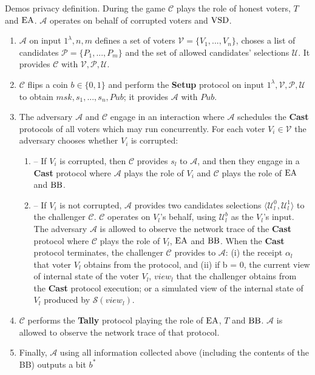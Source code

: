 \begin{definition}{ Demos privacy definition.}
 During the game $\mathcal{C}$ plays the role of honest voters, $T$ and $\operatorname{EA}$. $\mathcal{A}$ operates on behalf of corrupted voters and $\operatorname{VSD}$. 
\begin{enumerate}
\item $\mathcal{A}$ on input $1^{\lambda},n,m$ defines a set of voters  $\mathcal{V} = \{V_1,...,V_n\}$, choses a list of candidates  $\mathcal{P} = \{P_1,...,P_m\}$ and the set of allowed candidates' selections $\mathcal{U}$.  It provides $\mathcal{C}$ with $\mathcal{V}, \mathcal{P}, \mathcal{U}$.
\item $\mathcal{C}$ flips a coin $b\in \{0,1\}$ and perform the \textbf{Setup} protocol on input $1^{\lambda},\mathcal{V}, \mathcal{P}, \mathcal{U}$ to obtain $msk,s_1,...,s_n, Pub$; it provides  $\mathcal{A}$ with $Pub$. 
\item The adversary $\mathcal{A}$  and $\mathcal{C}$ engage in an interaction where $\mathcal{A}$ schedules the \textbf{Cast} protocols of all voters which may run concurrently. For each voter  $V_i \in \mathcal{V}$ the adversary chooses whether $V_i$ is corrupted:
\begin{enumerate}
\item[] -- If $V_i$ is corrupted, then $\mathcal{C}$ provides $s_l$ to $\mathcal{A}$, and then they engage in a  \textbf{Cast} protocol where $\mathcal{A}$ plays the role of $V_i$ and  $\mathcal{C}$ plays the role of $\operatorname{EA}$ and $\operatorname{BB}$.
\item[] --  If $V_i$ is not corrupted, $\mathcal{A}$ provides two candidates selections $\langle \mathcal{U}^0_l , \mathcal{U}^1_l \rangle$ to the challenger $\mathcal{C}$. $\mathcal{C}$ operates on $V_l$'s behalf, using  $\mathcal{U}^b_l$ as the $V_l$'s input. The adversary  $\mathcal{A}$ is allowed to observe the network trace of the \textbf{Cast} protocol where  $\mathcal{C}$ plays the role of $V_l$, $\operatorname{EA}$ and $\operatorname{BB}$. When the  \textbf{Cast} protocol terminates, the challenger  $\mathcal{C}$ provides to $\mathcal{A}$: (i) the receipt $\alpha_l$ that voter $V_l$ obtains from the protocol, and (ii) if b = 0, the current view of internal state of the voter $V_l$, $view_l$ that the challenger obtains from the \textbf{Cast} protocol execution; or  a simulated view of the internal state of $V_l$ produced by $\mathcal{S}(view_l)$.
\end{enumerate}
\item $\mathcal{C}$ performs the  \textbf{Tally} protocol playing the role of $\operatorname{EA}$, $T$  and $\operatorname{BB}$. $\mathcal{A}$ is allowed to observe the network trace of that protocol. 
\item Finally, $\mathcal{A}$ using all information collected above (including the contents of the BB) outputs a bit $b^*$

\end{enumerate}
\end{definition}

